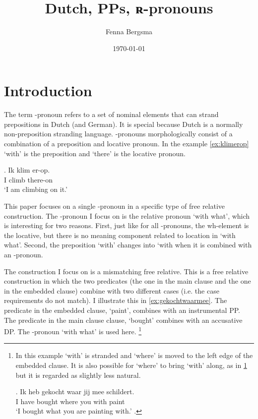 \documentclass{article}
\title{Dutch, PPs, ʀ-pronouns}
\author{Fenna Bergsma}
\date{\today}
\begin{document}
\maketitle






\section{Introduction}

The term -pronoun \citep{riemsdijk1978} refers to a set of nominal elements that can strand prepositions in Dutch (and German). It is special because Dutch is a normally non-preposition stranding language. -pronouns morphologically consist of a combination of a preposition and locative pronoun. In the example \ref{ex:klimerop}  `with' is the preposition and  `there' is the locative pronoun.

\exg. Ik klim er-op.\\
 I climb there-on\\
 `I am climbing on it.'\label{ex:klimerop}

This paper focuses on a single -pronoun in a specific type of free relative construction. The -pronoun I focus on is the relative pronoun  `with what', which is interesting for two reasons. First, just like for all -pronouns, the wh-element is the locative, but there is no meaning component related to location in `with what'. Second, the preposition  `with' changes into  `with when it is combined with an -pronoun.

The construction I focus on is a mismatching free relative. This is a free relative construction in which the two predicates (the one in the main clause and the one in the embedded clause) combine with two different cases (i.e. the case requirements do not match). I illustrate this in \ref{ex:gekochtwaarmee}. The predicate in the embedded clause,  `paint', combines with an instrumental PP. The predicate in the main clause clause,  `bought' combines with an accusative DP. The -pronoun  `with what' is used here.
\footnote{In this example  `with' is stranded and  `where' is moved to the left edge of the embedded clause. It is also possible for  `where' to bring  `with' along, as in \ref{ex:meealong} but it is regarded as slightly less natural.

\exg. Ik heb gekocht waar jij mee schildert.\\
 I have bought where you with paint\\
 `I bought what you are painting with.'\label{ex:meealong}
\z.

\phantom{x}
}
\end{document}
